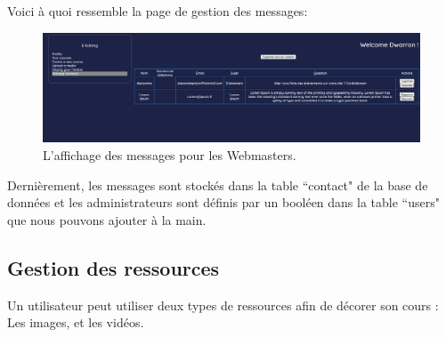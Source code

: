 \documentclass[a4paper,11pt]{article}
\begin{document}
Voici à quoi ressemble la page de gestion des messages:
\begin{figure}[!h]
\centerline{\includegraphics[width=16cm]{images/manageContact.PNG}}
\caption{L'affichage des messages pour les Webmasters.}
\label{fig}
\end{figure}

Dernièrement, les messages sont stockés dans la table ``contact" de la base de données et les administrateurs sont définis par un booléen dans la table ``users" que nous pouvons ajouter à la main.

\subsection{Gestion des ressources}
Un utilisateur peut utiliser deux types de ressources afin de décorer son cours : Les images, et les vidéos.\\\\
\end{document}
